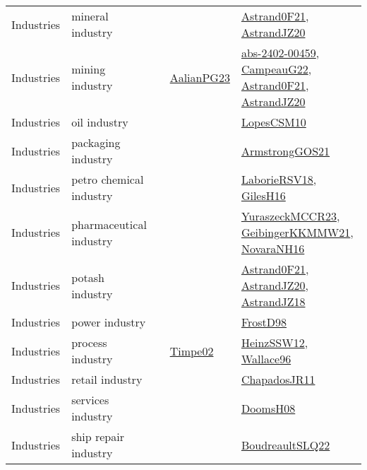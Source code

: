 {\begin{longtable}{lp{3cm}>{\raggedright}p{6cm}>{\raggedright}p{6cm}p{8cm}}
Industries & mineral industry &  &  & \href{papers/Astrand0F21.pdf}{Astrand0F21}\cite{Astrand0F21}, \href{articles/AstrandJZ20.pdf}{AstrandJZ20}\cite{AstrandJZ20}\\
Industries & mining industry &  & \href{papers/AalianPG23.pdf}{AalianPG23}\cite{AalianPG23} & \href{articles/abs-2402-00459.pdf}{abs-2402-00459}\cite{abs-2402-00459}, \href{articles/CampeauG22.pdf}{CampeauG22}\cite{CampeauG22}, \href{papers/Astrand0F21.pdf}{Astrand0F21}\cite{Astrand0F21}, \href{articles/AstrandJZ20.pdf}{AstrandJZ20}\cite{AstrandJZ20}\\
Industries & oil industry &  &  & \href{articles/LopesCSM10.pdf}{LopesCSM10}\cite{LopesCSM10}\\
Industries & packaging industry &  &  & \href{papers/ArmstrongGOS21.pdf}{ArmstrongGOS21}\cite{ArmstrongGOS21}\\
Industries & petro chemical industry &  &  & \href{articles/LaborieRSV18.pdf}{LaborieRSV18}\cite{LaborieRSV18}, \href{papers/GilesH16.pdf}{GilesH16}\cite{GilesH16}\\
Industries & pharmaceutical industry &  &  & \href{articles/YuraszeckMCCR23.pdf}{YuraszeckMCCR23}\cite{YuraszeckMCCR23}, \href{papers/GeibingerKKMMW21.pdf}{GeibingerKKMMW21}\cite{GeibingerKKMMW21}, \href{articles/NovaraNH16.pdf}{NovaraNH16}\cite{NovaraNH16}\\
Industries & potash industry &  &  & \href{papers/Astrand0F21.pdf}{Astrand0F21}\cite{Astrand0F21}, \href{articles/AstrandJZ20.pdf}{AstrandJZ20}\cite{AstrandJZ20}, \href{papers/AstrandJZ18.pdf}{AstrandJZ18}\cite{AstrandJZ18}\\
Industries & power industry &  &  & \href{papers/FrostD98.pdf}{FrostD98}\cite{FrostD98}\\
Industries & process industry &  & \href{articles/Timpe02.pdf}{Timpe02}\cite{Timpe02} & \href{articles/HeinzSSW12.pdf}{HeinzSSW12}\cite{HeinzSSW12}, \href{articles/Wallace96.pdf}{Wallace96}\cite{Wallace96}\\
Industries & retail industry &  &  & \href{papers/ChapadosJR11.pdf}{ChapadosJR11}\cite{ChapadosJR11}\\
Industries & services industry &  &  & \href{papers/DoomsH08.pdf}{DoomsH08}\cite{DoomsH08}\\
Industries & ship repair industry &  &  & \href{papers/BoudreaultSLQ22.pdf}{BoudreaultSLQ22}\cite{BoudreaultSLQ22}\\

\end{longtable}}
